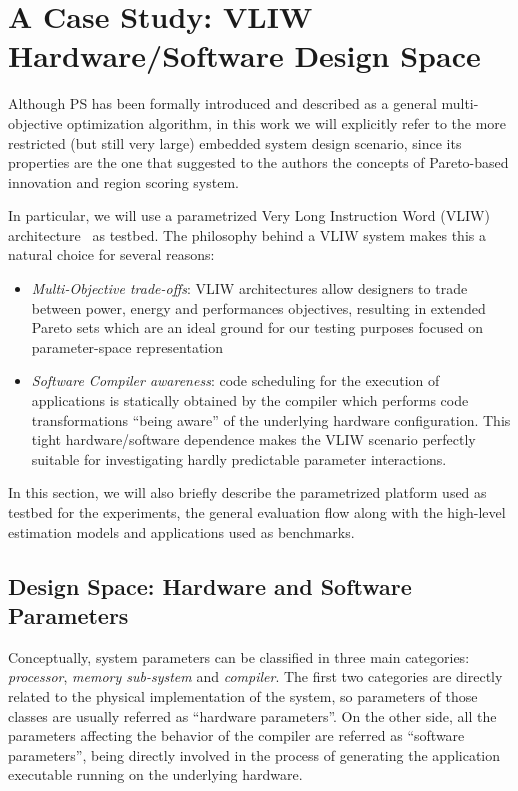 \section{A Case Study: VLIW Hardware/Software Design Space}
Although PS has been formally introduced and described as a general
multi-objective optimization algorithm, in this work we will
explicitly refer to the more restricted (but still very large)
embedded system design scenario,  since its properties
are the one that suggested to the authors the concepts of Pareto-based
innovation and region scoring system.

In particular, we will use a parametrized Very Long Instruction
Word (VLIW) architecture~\cite{kathail_tr00} as testbed. The philosophy
behind a VLIW system makes this a natural choice for several reasons:
\begin{itemize}
\item \emph{Multi-Objective trade-offs}: VLIW architectures allow designers
to trade between power, energy and performances objectives, resulting
in extended Pareto sets which are an ideal ground for our testing
purposes focused on parameter-space representation
\item \emph{Software Compiler awareness}: code scheduling for the execution of
applications is statically obtained by the compiler which
performs code transformations ``being aware'' of the underlying hardware
configuration.  This tight hardware/software dependence makes the
VLIW scenario perfectly suitable for investigating hardly predictable
parameter interactions.
\end{itemize}

In this section, we will also briefly describe the parametrized platform used
as testbed for the experiments, the general evaluation flow along with
the high-level estimation models and applications used as benchmarks.

\subsection{Design Space: Hardware and Software Parameters}
Conceptually, system parameters can be classified in three main categories:
\emph{processor}, \emph{memory sub-system} and \emph{compiler}. The
first two categories are directly related to the physical
implementation of the system, so parameters of those
classes are usually referred as ``hardware parameters''. On the other
side, all the parameters affecting the behavior of the compiler
are referred as ``software parameters'', being directly involved in
the process of generating the application executable running on the
underlying hardware.

